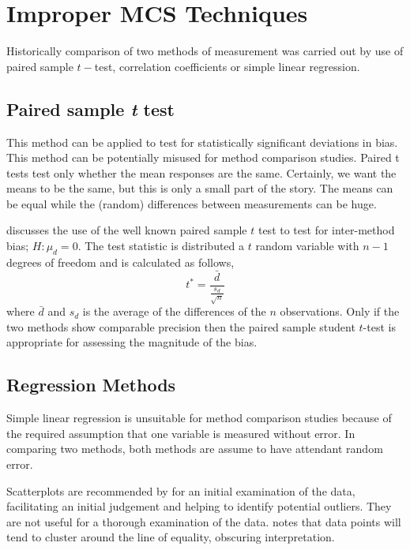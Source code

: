\documentclass[12pt, a4paper]{report}
\theoremstyle{plain}
\theoremstyle{definition}
\theoremstyle{remark}
\begin{document}
	
	
	
	\section{Improper MCS Techniques}

	Historically comparison of two methods of measurement was carried
	out by use of paired sample $t-$test, correlation coefficients or
	simple linear regression. 
	
	
	\subsection{Paired sample \emph{t} test}
	This method can be applied to test for statistically significant deviations in bias. This method can be potentially misused for method comparison studies. Paired t tests test only whether the mean responses are the same. Certainly, we want the means to be the same, but this is only a small part of the story. The means can be equal while the (random) differences between measurements can be huge.
	
	\citet{Bartko} discusses the use of the well known paired sample $t$ test to test for inter-method bias; $H: \mu_{d}=0$. The test
	statistic is distributed a $t$ random variable with $n-1$ degrees of freedom and is calculated as follows,
	\begin{equation}
	t^{*} = \frac{\bar{d}}{ \frac{s_{d}}{\sqrt{n}}}
	\end{equation}
	where $\bar{d}$ and $s_{d}$ is the average of the differences of the $n$ observations. Only if the two methods show comparable
	precision then the paired sample student $t$-test is appropriate for assessing the magnitude of the bias.
	
	
	
	

	\subsection{Regression Methods}
	
	Simple linear regression is unsuitable for method comparison studies because of the required assumption that one variable is measured without error. In comparing two methods, both methods are assume to have attendant random error.
	
	
	Scatterplots are recommended by \citet{BA83} for an initial
	examination of the data, facilitating an initial judgement and
	helping to identify potential outliers. They are not useful for a
	thorough examination of the data. \citet{BritHypSoc} notes that
	data points will tend to cluster around the line of equality,
	obscuring interpretation.
	
\end{document}
